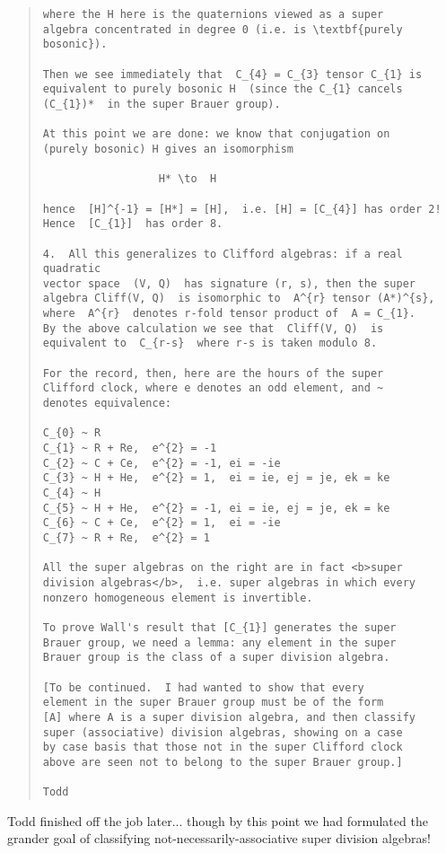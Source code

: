 \begin{quote}
\begin{verbatim}
where the H here is the quaternions viewed as a super 
algebra concentrated in degree 0 (i.e. is \textbf{purely bosonic}). 

Then we see immediately that  C_{4} = C_{3} tensor C_{1} is 
equivalent to purely bosonic H  (since the C_{1} cancels 
(C_{1})*  in the super Brauer group). 

At this point we are done: we know that conjugation on 
(purely bosonic) H gives an isomorphism 

                  H* \to  H 

hence  [H]^{-1} = [H*] = [H],  i.e. [H] = [C_{4}] has order 2!  
Hence  [C_{1}]  has order 8. 

4.  All this generalizes to Clifford algebras: if a real quadratic 
vector space  (V, Q)  has signature (r, s), then the super 
algebra Cliff(V, Q)  is isomorphic to  A^{r} tensor (A*)^{s}, 
where  A^{r}  denotes r-fold tensor product of  A = C_{1}. 
By the above calculation we see that  Cliff(V, Q)  is 
equivalent to  C_{r-s}  where r-s is taken modulo 8. 

For the record, then, here are the hours of the super 
Clifford clock, where e denotes an odd element, and ~ 
denotes equivalence: 

C_{0} ~ R
C_{1} ~ R + Re,  e^{2} = -1
C_{2} ~ C + Ce,  e^{2} = -1, ei = -ie
C_{3} ~ H + He,  e^{2} = 1,  ei = ie, ej = je, ek = ke
C_{4} ~ H
C_{5} ~ H + He,  e^{2} = -1, ei = ie, ej = je, ek = ke
C_{6} ~ C + Ce,  e^{2} = 1,  ei = -ie
C_{7} ~ R + Re,  e^{2} = 1

All the super algebras on the right are in fact <b>super 
division algebras</b>,  i.e. super algebras in which every 
nonzero homogeneous element is invertible. 

To prove Wall's result that [C_{1}] generates the super 
Brauer group, we need a lemma: any element in the super 
Brauer group is the class of a super division algebra. 

[To be continued.  I had wanted to show that every 
element in the super Brauer group must be of the form 
[A] where A is a super division algebra, and then classify 
super (associative) division algebras, showing on a case 
by case basis that those not in the super Clifford clock 
above are seen not to belong to the super Brauer group.] 

Todd
\end{verbatim}
    
\end{quote}

Todd finished off the job later... though by this point we
had formulated the grander goal of classifying 
not-necessarily-associative super division algebras!


